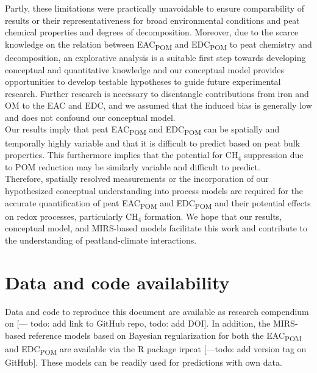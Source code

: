 \documentclass[alpha-refs]{wiley-article-rmd}
\begin{document}
\begin{refsection}
Partly, these limitations were practically unavoidable to ensure comparability of results or their representativeness for broad environmental conditions and peat chemical properties and degrees of decomposition. Moreover, due to the scarce knowledge on the relation between EAC\textsubscript{POM} and EDC\textsubscript{POM} to peat chemistry and decomposition, an explorative analysis is a suitable first step towards developing conceptual and quantitative knowledge and our conceptual model provides opportunities to develop testable hypotheses to guide future experimental research. Further research is necessary to disentangle contributions from iron and OM to the EAC and EDC, and we assumed that the induced bias is generally low and does not confound our conceptual model.\\
Our results imply that peat EAC\textsubscript{POM} and EDC\textsubscript{POM} can be spatially and temporally highly variable and that it is difficult to predict based on peat bulk properties. This furthermore implies that the potential for CH\(_4\) suppression due to POM reduction may be similarly variable and difficult to predict.\\
Therefore, spatially resolved measurements or the incorporation of our hypothesized conceptual understanding into process models are required for the accurate quantification of peat EAC\textsubscript{POM} and EDC\textsubscript{POM} and their potential effects on redox processes, particularly CH\(_4\) formation. We hope that our results, conceptual model, and MIRS-based models facilitate this work and contribute to the understanding of peatland-climate interactions.

\hypertarget{data-and-code-availability}{%
\section*{Data and code availability}\label{data-and-code-availability}}

Data and code to reproduce this document are available as research compendium on {[}--- todo: add link to GitHub repo, todo: add DOI{]}. In addition, the MIRS-based reference models based on Bayesian regularization for both the EAC\textsubscript{POM} and EDC\textsubscript{POM} are available via the R package irpeat \autocite{Teickner.2020b} {[}---todo: add version tag on GitHub{]}. These models can be readily used for predictions with own data.

\hypertarget{author-contributions}{%
}
\end{refsection}
\end{document}
